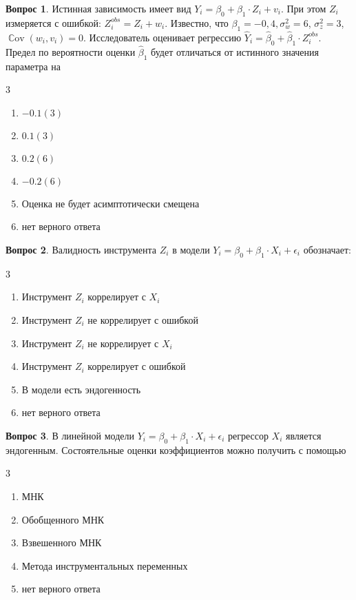 \documentclass[12pt]{article}
\DeclareMathOperator{\Cov}{\mathbb{C}ov}
\newenvironment{answerlist}[1][3]{
\begin{multicols}{#1}
\begin{enumerate}[label=\fbox{\emph{\Alph*}},ref=\emph{\alph*}]
}
{
\end{enumerate}
\end{multicols}
}
\theoremstyle{definition}
\newtheorem{question}{Вопрос}
\begin{document}
\begin{question}
Истинная зависимость имеет вид  \( Y_i = \beta_0 + \beta_1 \cdot Z_i + v_i \). 
При этом \( Z_i \) измеряется с ошибкой: \( Z^{obs}_i= Z_i + w_i \). 
Известно, что \( \beta_1= -0,4, \sigma^2_{w} = 6 \), \( \sigma^2_{z} = 3 \), 
\(\Cov(w_i, v_i) = 0\). 
Исследователь оценивает регрессию  $\hat Y_i = \hat\beta_0 + \hat\beta_1 \cdot Z^{obs}_i$. 
Предел по вероятности оценки $\hat\beta_1$ будет отличаться от истинного значения параметра на
\begin{answerlist}
  \item $-0.1(3)$
  \item $0.1(3)$
  \item $0.2(6)$
  \item $-0.2(6)$
  \item Оценка не будет асимптотически смещена
  \item нет верного ответа
\end{answerlist}
\end{question}


\begin{question}
Валидность инструмента \( Z_i \) в модели \( Y_i = \beta_0 + \beta_1 \cdot X_i + \epsilon_i \) обозначает:
\begin{answerlist}
  \item Инструмент \( Z_i \) коррелирует с \( X_i \)
  \item Инструмент \( Z_i \) не коррелирует с ошибкой
  \item Инструмент \( Z_i \) не коррелирует с \( X_i \)
  \item Инструмент \( Z_i \) коррелирует с ошибкой
  \item В модели есть эндогенность
  \item нет верного ответа
\end{answerlist}
\end{question}

\begin{question}
В линейной модели \( Y_i = \beta_0 + \beta_1 \cdot X_i + \epsilon_i \) регрессор \( X_i \) 
является эндогенным. 
Состоятельные оценки коэффициентов можно получить с помощью
\begin{answerlist}
  \item МНК
  \item Обобщенного МНК
  \item Взвешенного МНК   
  \item Метода инструментальных переменных  
  \item нет верного ответа
\end{answerlist}
\end{question}
\end{document}
